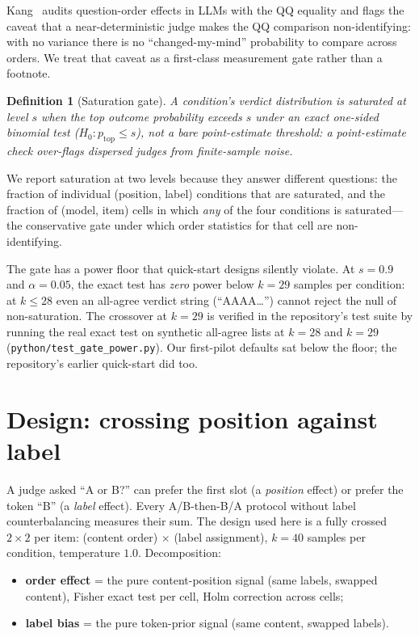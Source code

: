 \documentclass[11pt]{article}
\newtheorem{definition}{Definition}
\begin{document}
Kang~\cite{kang2026} audits question-order effects in LLMs with the QQ
equality and flags the caveat that a near-deterministic judge makes the QQ
comparison non-identifying: with no variance there is no
``changed-my-mind'' probability to compare across orders. We treat that
caveat as a first-class measurement gate rather than a footnote.

\begin{definition}[Saturation gate]
A condition's verdict distribution is \emph{saturated at level $s$} when the
top outcome probability exceeds $s$ under an exact one-sided binomial test
($H_0\colon p_{\text{top}} \le s$), not a bare point-estimate threshold: a
point-estimate check over-flags dispersed judges from finite-sample noise.
\end{definition}

We report saturation at two levels because they answer different questions:
the fraction of individual (position, label) conditions that are saturated,
and the fraction of (model, item) cells in which \emph{any} of the four
conditions is saturated---the conservative gate under which order statistics
for that cell are non-identifying.

The gate has a power floor that quick-start designs silently violate. At
$s = 0.9$ and $\alpha = 0.05$, the exact test has \emph{zero} power below
$k = 29$ samples per condition: at $k \le 28$ even an all-agree verdict
string (``AAAA\ldots'') cannot reject the null of non-saturation. The
crossover at $k=29$ is verified in the repository's test suite by running
the real exact test on synthetic all-agree lists at $k{=}28$ and $k{=}29$
(\texttt{python/test\_gate\_power.py}). Our first-pilot defaults sat below
the floor; the repository's earlier quick-start did too.

\section{Design: crossing position against label}
\label{sec:design}

A judge asked ``A or B?'' can prefer the first slot (a \emph{position}
effect) or prefer the token ``B'' (a \emph{label} effect). Every A/B-then-B/A
protocol without label counterbalancing measures their sum. The design used
here is a fully crossed $2\times2$ per item: (content order) $\times$
(label assignment), $k = 40$ samples per condition, temperature $1.0$.
Decomposition:

\begin{itemize}
\item \textbf{order effect} = the pure content-position signal (same labels,
swapped content), Fisher exact test per cell, Holm correction across cells;
\item \textbf{label bias} = the pure token-prior signal (same content,
swapped labels).
\end{itemize}
\end{document}

